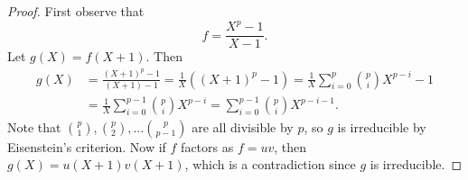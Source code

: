 \begin{proof}
  First observe that
  \[f = \frac{X^p - 1}{X - 1}.\]
  Let $g(X) = f(X + 1)$. Then
  \begin{align*}
    g(X)
    &= \frac{(X + 1)^p - 1}{(X + 1) - 1}
    = \frac{1}{X} ((X + 1)^p - 1)
    = \frac{1}{X} \sum_{i = 0}^p \binom{p}{i} X^{p - i} - 1 \\
    &= \frac{1}{X} \sum_{i = 0}^{p - 1} \binom{p}{i} X^{p - i}
    = \sum_{i = 0}^{p - 1} \binom{p}{i} X^{p - i - 1}.
  \end{align*}
  Note that $\binom{p}{1}, \binom{p}{2}, \dots \binom{p}{p - 1}$
  are all divisible by $p$, so $g$ is irreducible by
  Eisenstein's criterion. Now if $f$ factors as
  $f = uv$, then $g(X) = u(X + 1)v(X + 1)$, which
  is a contradiction since $g$ is irreducible.
\end{proof}
